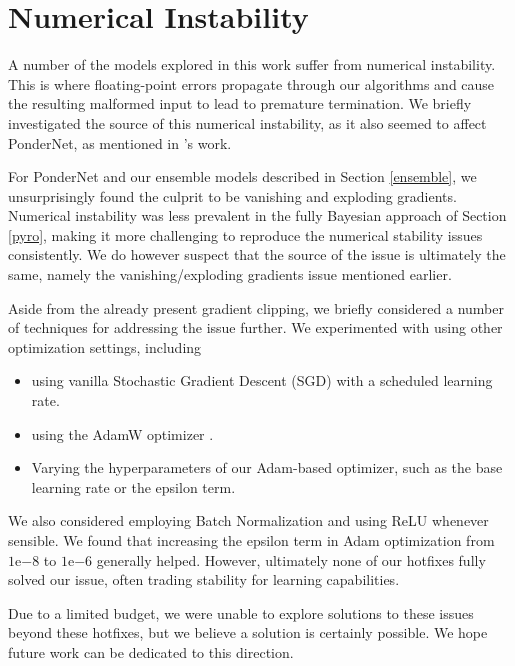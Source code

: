 \documentclass{article}
\begin{document}
\newpage
 

\newpage
\appendix
\section{Numerical Instability}

A number of the models explored in this work suffer from numerical instability. This is where floating-point errors propagate through our algorithms and cause the resulting malformed input to lead to premature termination. We briefly investigated the source of this numerical instability, as it also seemed to affect PonderNet, as mentioned in \citet{banino_pondernet_2021}'s work. 

For PonderNet and our ensemble models described in Section \ref{ensemble}, we unsurprisingly found the culprit to be vanishing and exploding gradients. Numerical instability was less prevalent in the fully Bayesian approach of Section \ref{pyro}, making it more challenging to reproduce the numerical stability issues consistently. We do however suspect that the source of the issue is ultimately the same, namely the vanishing/exploding gradients issue mentioned earlier.

Aside from the already present gradient clipping, we briefly considered a number of techniques for addressing the issue further. We experimented with using other optimization settings, including 
\begin{itemize}
    \item using vanilla Stochastic Gradient Descent (SGD) with a scheduled learning rate.
    \item using the AdamW optimizer \citep{loshchilov_decoupled_2018}.
    \item Varying the hyperparameters of our Adam-based optimizer, such as the base learning rate or the epsilon term.
\end{itemize}
We also considered employing Batch Normalization \citep{ioffe_batch_2015} and using ReLU whenever sensible. We found that increasing the epsilon term in Adam optimization from $1\mathrm{e}{-8}$ to $1\mathrm{e}{-6}$ generally helped. However, ultimately none of our hotfixes fully solved our issue, often trading stability for learning capabilities. 

Due to a limited budget, we were unable to explore solutions to these issues beyond these hotfixes, but we believe a solution is certainly possible. We hope future work can be dedicated to this direction.
\end{document}
